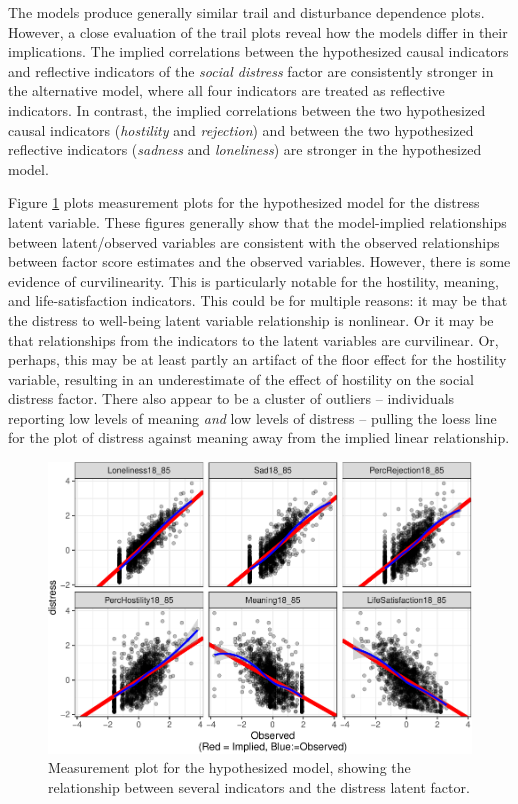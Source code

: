 \documentclass[
  english,
  man]{apa6}
\begin{document}
The models produce generally similar trail and disturbance dependence plots. However, a close evaluation of the trail plots reveal how the models differ in their implications. The implied correlations between the hypothesized causal indicators and reflective indicators of the \emph{social distress} factor are consistently stronger in the alternative model, where all four indicators are treated as reflective indicators. In contrast, the implied correlations between the two hypothesized causal indicators (\emph{hostility} and \emph{rejection}) and between the two hypothesized reflective indicators (\emph{sadness} and \emph{loneliness}) are stronger in the hypothesized model.

Figure \ref{fig:measurementrealdistress} plots measurement plots for the hypothesized model for the distress latent variable. These figures generally show that the model-implied relationships between latent/observed variables are consistent with the observed relationships between factor score estimates and the observed variables. However, there is some evidence of curvilinearity. This is particularly notable for the hostility, meaning, and life-satisfaction indicators. This could be for multiple reasons: it may be that the distress to well-being latent variable relationship is nonlinear. Or it may be that relationships from the indicators to the latent variables are curvilinear. Or, perhaps, this may be at least partly an artifact of the floor effect for the hostility variable, resulting in an underestimate of the effect of hostility on the social distress factor. There also appear to be a cluster of outliers -- individuals reporting low levels of meaning \emph{and} low levels of distress -- pulling the loess line for the plot of distress against meaning away from the implied linear relationship.

\begin{figure}

{\centering \includegraphics[width=0.8\linewidth]{flexplavaan_draft_files/figure-latex/measurementrealdistress-1} 

}

\caption{Measurement plot for the hypothesized model, showing the relationship between several indicators and the distress latent factor.}\label{fig:measurementrealdistress}
\end{figure}
\end{document}
